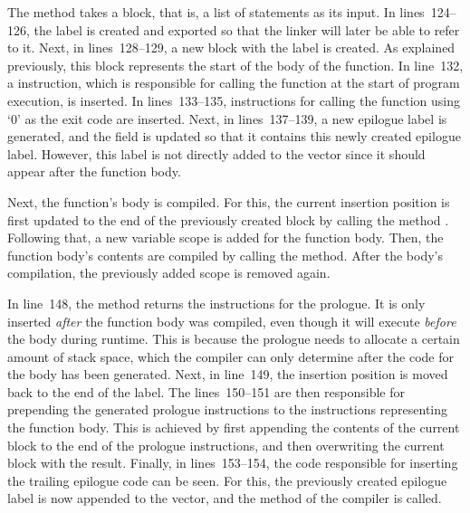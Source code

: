 
The method takes a block, that is, a list of statements as its input.
In lines~124--126, the  label is created and exported so that the linker will later be able to refer to it.
Next, in lines~128--129, a new block with the  label is created.
As explained previously, this block represents the start of the body of the  function.
In line~132, a  instruction, which is responsible for calling the  function at the start of program execution, is inserted.
In lines~133--135, instructions for calling the  function using `0' as the exit code are inserted.
Next, in lines~137--139, a new epilogue label is generated, and the  field is updated so that it contains this newly created epilogue label.
However, this label is not directly added to the  vector since it should appear after the function body.

Next, the  function's body is compiled.
For this, the current insertion position is first updated to the end of the previously created  block by calling the method .
Following that, a new variable scope is added for the function body.
Then, the function body's contents are compiled by calling the  method.
After the body's compilation, the previously added scope is removed again.

In line~148, the  method returns the instructions for the prologue.
It is only inserted \emph{after} the function body was compiled, even though it will execute \emph{before} the body during runtime.
This is because the prologue needs to allocate a certain amount of stack space, which the compiler can only determine after the code for the body has been generated.
Next, in line~149, the insertion position is moved back to the end of the  label.
The lines~150--151 are then responsible for prepending the generated prologue instructions to the instructions representing the function body.
This is achieved by first appending the contents of the current block to the end of the prologue instructions, and then overwriting the current block with the result.
Finally, in lines~153--154, the code responsible for inserting the trailing epilogue code can be seen.
For this, the previously created epilogue label is now appended to the  vector, and the  method of the compiler is called.

